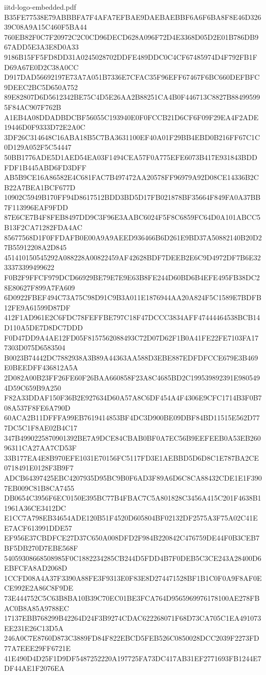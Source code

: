 \begin{filecontents*}[overwrite]{iitd-logo-embedded.pdf}
B35FE77538E79ABBBFA7F4AFA7EFBAE9DAEBAEBBF6A6F6BA8F8E46D32639C08A9A15C460F5BA44
760EB82F0C7F20972C2C0CD96DECD628A096F72D4E3368D05D2E01B786DB967ADD5E3A3E8D0A33
9186B15FF5FD8DD31A0245028702DDFE489DDC0C4CF67485974D4F792FB1FD69A67E0D2C38A0CC
D917DAD56692197E73A7A051B7336E7CFAC35F96EFF67467F6BC660DEFBFC9DEEC2BC5D650A752
89E82807D6D5612342BE75C4D5E26AA2B88251CA4B0F446713C8827B884995995F84AC907F762B
A1EB4A08DDADBDCBF56055C193940E0F0FCCB21D6CF6F09F29EA4F2ADE19446D0F9333D72E2A0C
3DF26C314648C16ABA18B5C7BA3631100EF40A01F29BB4EBD0B216FF67C1C0D129A052F5C54447
50BB1776ADE5D1AED54EA03F1494CEA57F0A775EFE6073B417E931843BDDFDF1B445ABD6FD3DFF
AB5B9CE16A86582E4C681FAC7B497472AA20578FF96979A92D08CE14336B2CB22A7BEA1BCF677D
10902C5949B170FF94D8617512BDD3BD5D17FB021878BF35664F849FA0A37BB7F113996EAF9FDD
87E6CE7B4F8FEB8497DD9C3F96E3AABC6024F5F8C6859FC64D0A101ABCC5B13F2CA71282FDA4AC
85677568D1F0FFDAFB0E00A9A9AEED936466B6D261E9BD37A50882140B20D27B55912208A2D845
451410150545292A088228A00822459AF42628BDF7DEEB2E6C9D4972DF7B6E3233373399499622
F0B2F9FFCF979DCD66929BE79E7E9E63B8FE244D60BD6B4EFE495FB38DC28E80627F899A7FA609
6D0922FBEF494C73A75C98D91C9B3A011E1876944AA20A824F5C1589E7BDFB12FE9A61599D87DF
412F1AD961E2C6FDC78FEFFBE797C18F47DCCC3834AFF47444464538BCB14D110A5DE7D8DC7DDD
F0D47DD9A4AE12FD05F8157562088493C72D07D62F1B0A41FE22FE7103FA177303D075D6583504
B0023B74442DC7882938A3B89A44363AA588D3EBE887EDFDFCCE679E3B469E0BEEDFF436812A5A
2D082A00B23FF26FE60F26BAA660858F23A8C4685BD2C199539892391E9805494D59C659B9A250
F82A33DDAF150F36B2E927634D60A57A8C6DF454A4F4306E9CFC1714B3F0B708A537F8FE6A790D
60ACA2B11DFFFA99EB7619414853BF4DC3D900BE09DBF84BD11515E562D777DC5C1F8AE02B4C17
347B4990225870901392BE7A9DCE84CBAB0BF0A7EC56B9EEFEEB0A53EB26096311CA27AA7CD53F
33B177EA4E8B970EFE1031E70156FC5117FD3E1AEBBD5D6D8C1E787BA2CE0718491E0128F3B9F7
ADCB64397425EBC4207935D95BC9B0F6AD3F89A6D6C8CA88432CDE1E1F3907EB009C81B8CA7455
DB0654C3956F6EC0150E395BC77B4FBAC7C5A801828C3456A415C201F4638B11961A36CE3412DC
E1CC7A798EB34654ADE120B51F4520D605804BF02132DF2575A3F75A02C41EE7ACF613991DDE57
EF956E37CBDFCE27D37C650A008DFD2F984B220842C476759DE44F0B3CEB7BF5DB270D7EBE568F
54059308668508985F0C1882234285CB244D5FDD4B7F0DEB5C3CE243A28400D6EBFCFA8AD2068D
1CCFD08A4A37F3390A88FE3F9313E0F83E8D274471528BF1B1C0F0A9F8AF0ECE992E2A86C8F9DE
73E444752C5C63B8BA10B39C70EC01BE3FCA764D9565969976178100AE278FBAC0B8A85A9788EC
17137EBB768299B42264D24F3B9274CDAC622268071F68D73CA705C1EA491073EE231E26C13D5A
246A0C7E8760D873C3889FD84F822EBCD5FEB526C0850028DCC2039F2273FD77A7EEE29FF6721E
41E490D4D25F1D9DF5487252220A197725FA73DC417AB31EF2771693FB1244E7DF44AE1F2076EA

\end{filecontents*}
